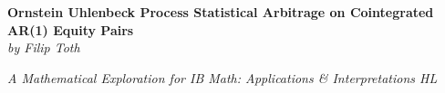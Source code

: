 \documentclass{article}
\begin{document}
\begin{titlepage}
    \vspace*{\fill}
    \vspace*{-4cm}
    \begin{center}
        \huge \textbf { Ornstein Uhlenbeck Process Statistical Arbitrage on Cointegrated AR(1) Equity Pairs } \\
        \vspace{0.5cm}
        \Large \textit { by Filip Toth }
    \end{center}
    \vspace*{\fill}
    \begin{center}
        \large \textit {A Mathematical Exploration for IB Math: Applications \& Interpretations HL}
    \end{center}
\end{titlepage}

\tableofcontents
\newpage
\end{document}
